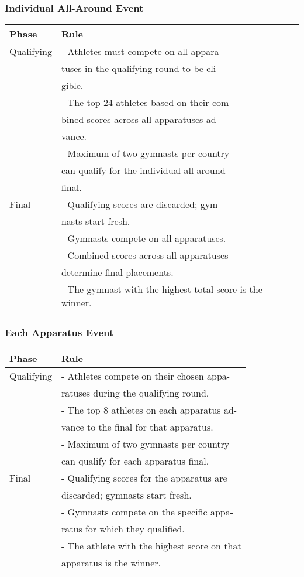\documentclass{article}
\theoremstyle{roman}
\begin{document}
\subsubsection{Individual All-Around Event}
\begin{center}
\begin{tabular}{|l|l|}
\hline
Phase & Rule \\
\hline
Qualifying & - Athletes must compete on all appara- \\
 & tuses in the qualifying round to be eli- \\
 & gible. \\
 & - The top 24 athletes based on their com- \\
 & bined scores across all apparatuses ad- \\
 & vance. \\
 & - Maximum of two gymnasts per country \\
 & can qualify for the individual all-around \\
 & final. \\
\hline
Final & - Qualifying scores are discarded; gym- \\
 & nasts start fresh. \\
 & - Gymnasts compete on all apparatuses. \\
 & - Combined scores across all apparatuses \\
 & determine final placements. \\
 & - The gymnast with the highest total score
is the winner. \\\hline
\end{tabular}
\end{center}


\subsubsection{Each Apparatus Event}
\begin{center}
\begin{tabular}{|l|l|}
\hline
Phase & Rule \\
\hline
Qualifying & - Athletes compete on their chosen appa- \\
 & ratuses during the qualifying round. \\
 & - The top 8 athletes on each apparatus ad- \\
 & vance to the final for that apparatus. \\
 & - Maximum of two gymnasts per country \\
 & can qualify for each apparatus final. \\
\hline
Final & - Qualifying scores for the apparatus are \\
 & discarded; gymnasts start fresh. \\
 & - Gymnasts compete on the specific appa- \\
 & ratus for which they qualified. \\
 & - The athlete with the highest score on that \\
 & apparatus is the winner. \\
\hline
\end{tabular}
\end{center}
\end{document}
